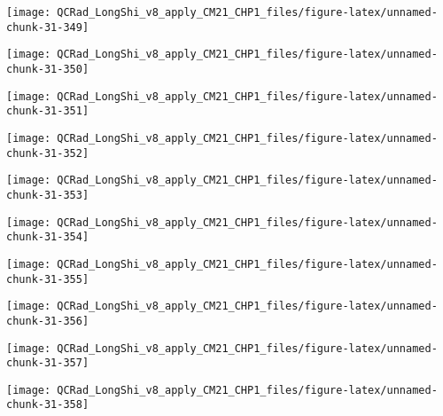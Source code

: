 \documentclass[
  10pt,
  a4paper,oneside]{article}
\begin{document}
\begin{center}\texttt{[image: QCRad\_LongShi\_v8\_apply\_CM21\_CHP1\_files/figure-latex/unnamed-chunk-31-349]} \end{center}

\begin{center}\texttt{[image: QCRad\_LongShi\_v8\_apply\_CM21\_CHP1\_files/figure-latex/unnamed-chunk-31-350]} \end{center}

\begin{center}\texttt{[image: QCRad\_LongShi\_v8\_apply\_CM21\_CHP1\_files/figure-latex/unnamed-chunk-31-351]} \end{center}

\begin{center}\texttt{[image: QCRad\_LongShi\_v8\_apply\_CM21\_CHP1\_files/figure-latex/unnamed-chunk-31-352]} \end{center}

\begin{center}\texttt{[image: QCRad\_LongShi\_v8\_apply\_CM21\_CHP1\_files/figure-latex/unnamed-chunk-31-353]} \end{center}

\begin{center}\texttt{[image: QCRad\_LongShi\_v8\_apply\_CM21\_CHP1\_files/figure-latex/unnamed-chunk-31-354]} \end{center}

\begin{center}\texttt{[image: QCRad\_LongShi\_v8\_apply\_CM21\_CHP1\_files/figure-latex/unnamed-chunk-31-355]} \end{center}

\begin{center}\texttt{[image: QCRad\_LongShi\_v8\_apply\_CM21\_CHP1\_files/figure-latex/unnamed-chunk-31-356]} \end{center}

\begin{center}\texttt{[image: QCRad\_LongShi\_v8\_apply\_CM21\_CHP1\_files/figure-latex/unnamed-chunk-31-357]} \end{center}

\begin{center}\texttt{[image: QCRad\_LongShi\_v8\_apply\_CM21\_CHP1\_files/figure-latex/unnamed-chunk-31-358]} \end{center}
\end{document}
